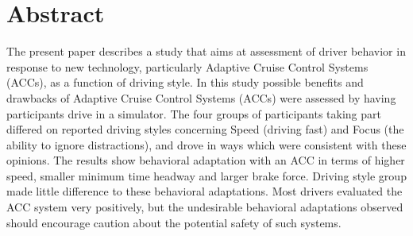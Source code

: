 \begin{sloppypar}
\section{Abstract}


The present paper describes a study that aims at assessment of driver behavior in response to new technology, particularly Adaptive Cruise Control Systems (ACCs), as a function of driving style. In this study possible benefits and drawbacks of Adaptive Cruise Control Systems (ACCs) were assessed by having participants drive in a simulator. The four groups of participants taking part differed on reported driving styles concerning Speed (driving fast) and Focus (the ability to ignore distractions), and drove in ways which were consistent with these opinions. The results show behavioral adaptation with an ACC in terms of higher speed, smaller minimum time headway and larger brake force. Driving style group made little difference to these behavioral adaptations. Most drivers evaluated the ACC system very positively, but the undesirable behavioral adaptations observed should encourage caution about the potential safety of such systems.

\newpage
\end{sloppypar}
%
%
